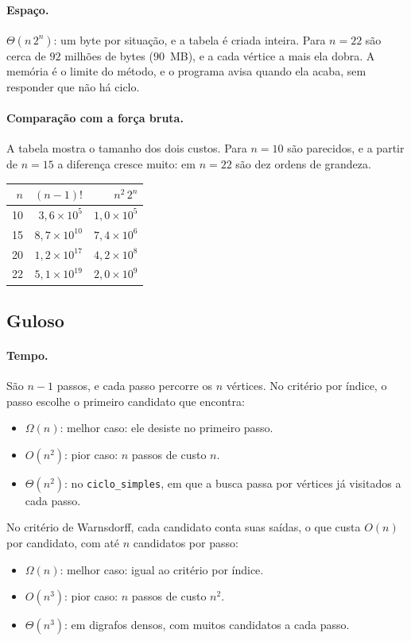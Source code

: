 \documentclass[12pt,a4paper]{article}
\begin{document}
\paragraph{Espaço.} $\Theta(n\,2^n)$: um byte por situação, e a tabela é criada inteira. Para $n=22$ são cerca de $92$ milhões de bytes ($90$~MB), e a cada vértice a mais ela dobra. A memória é o limite do método, e o programa avisa quando ela acaba, sem responder que não há ciclo.

\paragraph{Comparação com a força bruta.} A tabela mostra o tamanho dos dois custos. Para $n=10$ são parecidos, e a partir de $n=15$ a diferença cresce muito: em $n=22$ são dez ordens de grandeza.

\begin{center}
\small
\begin{tabular}{r r r}
\toprule
$n$ & $(n-1)!$ & $n^2\,2^n$\\
\midrule
10 & $3{,}6\times10^{5}$ & $1{,}0\times10^{5}$\\
15 & $8{,}7\times10^{10}$ & $7{,}4\times10^{6}$\\
20 & $1{,}2\times10^{17}$ & $4{,}2\times10^{8}$\\
22 & $5{,}1\times10^{19}$ & $2{,}0\times10^{9}$\\
\bottomrule
\end{tabular}
\end{center}

\subsection{Guloso}

\paragraph{Tempo.} São $n-1$ passos, e cada passo percorre os $n$ vértices. No critério por índice, o passo escolhe o primeiro candidato que encontra:
\begin{itemize}
  \item $\Omega(n)$: melhor caso: ele desiste no primeiro passo.
  \item $O(n^2)$: pior caso: $n$ passos de custo $n$.
  \item $\Theta(n^2)$: no \texttt{ciclo\_simples}, em que a busca passa por vértices já visitados a cada passo.
\end{itemize}
No critério de Warnsdorff, cada candidato conta suas saídas, o que custa $O(n)$ por candidato, com até $n$ candidatos por passo:
\begin{itemize}
  \item $\Omega(n)$: melhor caso: igual ao critério por índice.
  \item $O(n^3)$: pior caso: $n$ passos de custo $n^2$.
  \item $\Theta(n^3)$: em digrafos densos, com muitos candidatos a cada passo.
\end{itemize}
\end{document}
